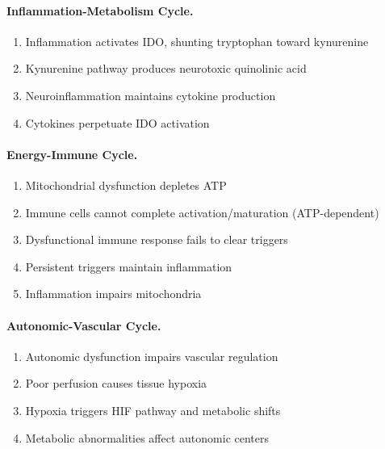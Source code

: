 \paragraph{Inflammation-Metabolism Cycle.}
\begin{enumerate}
    \item Inflammation activates IDO, shunting tryptophan toward kynurenine~\cite{Kavyani2022kynurenine}
    \item Kynurenine pathway produces neurotoxic quinolinic acid~\cite{Dehhaghi2022kynurenine}
    \item Neuroinflammation maintains cytokine production~\cite{Nakatomi2014neuroinflammation}
    \item Cytokines perpetuate IDO activation
\end{enumerate}

\paragraph{Energy-Immune Cycle.}
\begin{enumerate}
    \item Mitochondrial dysfunction depletes ATP~\cite{heng2025mecfs}
    \item Immune cells cannot complete activation/maturation (ATP-dependent)
    \item Dysfunctional immune response fails to clear triggers
    \item Persistent triggers maintain inflammation
    \item Inflammation impairs mitochondria~\cite{Syed2025}
\end{enumerate}

\paragraph{Autonomic-Vascular Cycle.}
\begin{enumerate}
    \item Autonomic dysfunction impairs vascular regulation
    \item Poor perfusion causes tissue hypoxia
    \item Hypoxia triggers HIF pathway and metabolic shifts
    \item Metabolic abnormalities affect autonomic centers
\end{enumerate}

